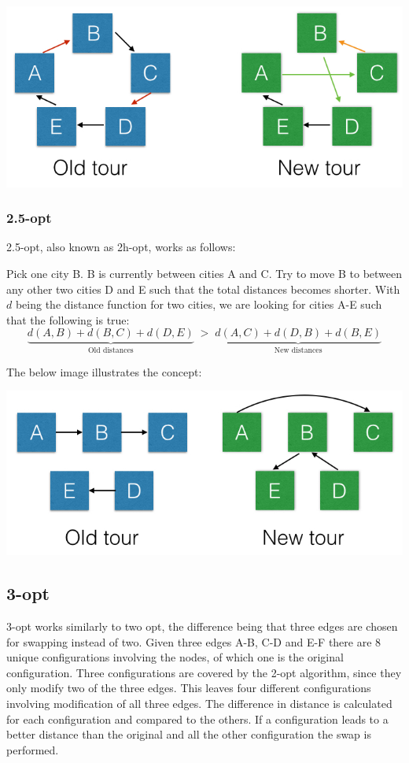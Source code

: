 \documentclass[paper=a4, fontsize=11pt,numbers=endperiod]{scrartcl} %
\numberwithin{equation}{section} %
\numberwithin{figure}{section} %
\numberwithin{table}{section} %
\begin{document}
\begin{center}
\includegraphics[scale=0.4]{2opt}
\end{center}

\subsubsection{2.5-opt}
2.5-opt, also known as 2h-opt, works as follows:

Pick one city B. B is currently between cities A and C. Try to move B to between any other two cities D and E such that the total distances becomes shorter. With $d$ being the distance function for two cities, we are looking for cities A-E such that the following is true:
\[
    \underbrace{d(A,B) + d(B,C) + d(D,E)}_\text{Old distances}\; > \;\underbrace{d(A,C) + d(D,B) + d(B,E)}_\text{New distances}
\]

The below image illustrates the concept:

\begin{center}
\includegraphics[scale=0.4]{25opt}
\end{center}

\subsection{3-opt}
3-opt works similarly to two opt, the difference being that three edges are chosen for swapping instead of two.
Given three edges A-B, C-D and E-F there are 8 unique configurations involving the nodes, of which one is the original configuration.
Three configurations are covered by the 2-opt algorithm, since they only modify two of the three edges.
This leaves four different configurations involving modification of all three edges.
The difference in distance is calculated for each configuration and compared to the others.
If a configuration leads to a better distance than the original and all the other configuration the swap is performed.
\end{document}
